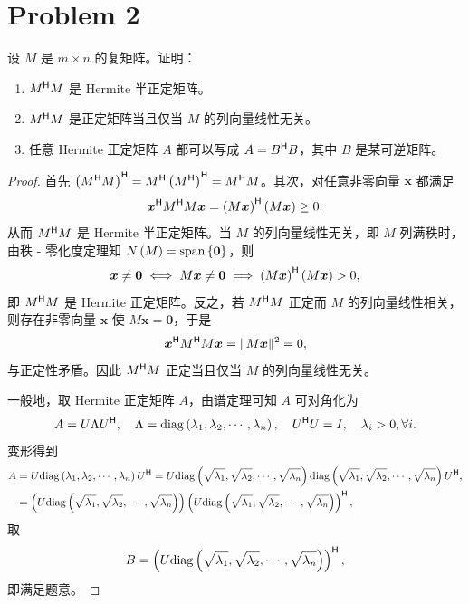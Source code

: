 \section*{Problem 2}

设 $M$ 是 $m \times n$ 的复矩阵。证明：

\begin{enumerate}
    \item $M^{\mathsf{H}} M$ 是 Hermite 半正定矩阵。
    \item $M^{\mathsf{H}} M$ 是正定矩阵当且仅当 $M$ 的列向量线性无关。
    \item 任意 Hermite 正定矩阵 $A$ 都可以写成 $A = B^{\mathsf{H}} B$，其中 $B$ 是某可逆矩阵。
\end{enumerate}

\begin{proof}
    首先 $\left(M^{\mathsf{H}} M\right)^{\mathsf{H}} = M^{\mathsf{H}} \left(M^{\mathsf{H}}\right)^{\mathsf{H}} = M^{\mathsf{H}} M$。其次，对任意非零向量 $\bm{x}$ 都满足
    \[
        \bm{x}^{\mathsf{H}} M^{\mathsf{H}} M \bm{x} = \left(M \bm{x}\right)^{\mathsf{H}} \left(M \bm{x}\right) \ge 0.
    \]
    从而 $M^{\mathsf{H}} M$ 是 Hermite 半正定矩阵。当 $M$ 的列向量线性无关，即 $M$ 列满秩时，由秩 - 零化度定理知 $N \left(M\right) = \mathrm{span} \left\{\bm{0}\right\}$，则
    \[
        \bm{x} \neq \bm{0} \iff M \bm{x} \neq \bm{0} \implies \left(M \bm{x}\right)^{\mathsf{H}} \left(M \bm{x}\right) > 0,
    \]
    即 $M^{\mathsf{H}} M$ 是 Hermite 正定矩阵。反之，若 $M^{\mathsf{H}} M$ 正定而 $M$ 的列向量线性相关，则存在非零向量 $\bm x$ 使 $M\bm x=\bm0$，于是
    \[
        \bm x^{\mathsf{H}} M^{\mathsf{H}} M\bm x=\|M\bm x\|^2=0,
    \]
    与正定性矛盾。因此 $M^{\mathsf{H}} M$ 正定当且仅当 $M$ 的列向量线性无关。

    一般地，取 Hermite 正定矩阵 $A$，由谱定理可知 $A$ 可对角化为
    \[
        A = U \Lambda U^{\mathsf{H}}, \quad \Lambda = \mathrm{diag} \left(\lambda_1, \lambda_2, \cdots, \lambda_n\right), \quad U^{\mathsf{H}} U = I, \quad \lambda_i > 0, \forall i.
    \]
    变形得到
    \[
        \begin{aligned}
            A &= U \mathrm{diag} \left(\lambda_1, \lambda_2, \cdots, \lambda_n\right) U^{\mathsf{H}} = U \mathrm{diag} \left(\sqrt{\lambda_1}, \sqrt{\lambda_2}, \cdots, \sqrt{\lambda_n}\right) \mathrm{diag} \left(\sqrt{\lambda_1}, \sqrt{\lambda_2}, \cdots, \sqrt{\lambda_n}\right) U^{\mathsf{H}}, \\
            &= \left(U \mathrm{diag} \left(\sqrt{\lambda_1}, \sqrt{\lambda_2}, \cdots, \sqrt{\lambda_n}\right)\right) \left(U \mathrm{diag} \left(\sqrt{\lambda_1}, \sqrt{\lambda_2}, \cdots, \sqrt{\lambda_n}\right)\right)^{\mathsf{H}},
        \end{aligned}
    \]
    取
    \[
        B = \left(U \mathrm{diag} \left(\sqrt{\lambda_1}, \sqrt{\lambda_2}, \cdots, \sqrt{\lambda_n}\right)\right)^{\mathsf{H}},
    \]
    即满足题意。
\end{proof}

